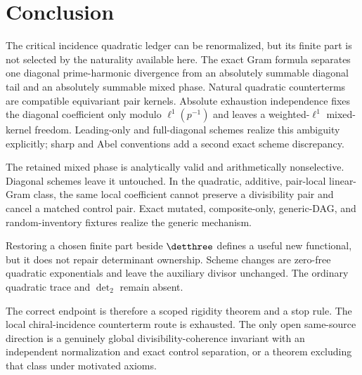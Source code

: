 \section{Conclusion}
\label{sec:conclusion}

The critical incidence quadratic ledger can be renormalized, but its finite
part is not selected by the naturality available here.  The exact Gram
formula separates one diagonal prime-harmonic divergence from an absolutely
summable diagonal tail and an absolutely summable mixed phase.  Natural
quadratic counterterms are compatible equivariant pair kernels.  Absolute
exhaustion independence fixes the diagonal coefficient only modulo
$\ell^1(p^{-1})$ and leaves a weighted-$\ell^1$ mixed-kernel freedom.
Leading-only and full-diagonal schemes realize this ambiguity explicitly;
sharp and Abel conventions add a second exact scheme discrepancy.

The retained mixed phase is analytically valid and arithmetically
nonselective.  Diagonal schemes leave it untouched.  In the quadratic,
additive, pair-local linear-Gram class, the same local coefficient cannot
preserve a divisibility pair and cancel a matched control pair.  Exact
mutated, composite-only, generic-DAG, and random-inventory fixtures realize
the generic mechanism.

Restoring a chosen finite part beside $\detthree$ defines a useful new
functional, but it does not repair determinant ownership.  Scheme changes
are zero-free quadratic exponentials and leave the auxiliary divisor
unchanged.  The ordinary quadratic trace and $\det_2$ remain absent.

The correct endpoint is therefore a scoped rigidity theorem and a stop rule.
The local chiral-incidence counterterm route is exhausted.  The only open
same-source direction is a genuinely global divisibility-coherence invariant
with an independent normalization and exact control separation, or a theorem
excluding that class under motivated axioms.
